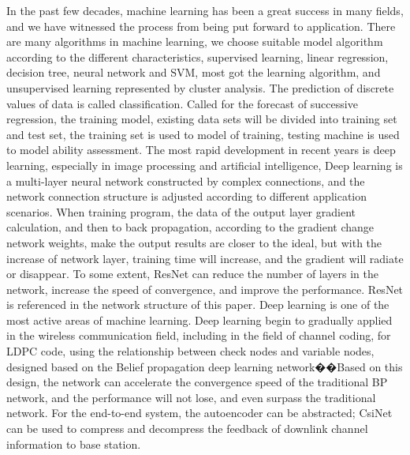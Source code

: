 \documentclass[conference]{IEEEtran}
\begin{document}
In the past few decades, machine learning has been a great success in many fields, and we have witnessed the process from being put forward to application. There are many algorithms in machine learning, we choose suitable model algorithm according to the different characteristics, supervised learning, linear regression, decision tree, neural network and SVM, most got the learning algorithm, and unsupervised learning represented by cluster analysis. The prediction of discrete values of data is called classification. Called for the forecast of successive regression, the training model, existing data sets will be divided into training set and test set, the training set is used to model of training, testing machine is used to model ability assessment.
The most rapid development in recent years is deep learning, especially in image processing and artificial intelligence, Deep learning is a multi-layer neural network constructed by complex connections, and the network connection structure is adjusted according to different application scenarios. When training program, the data of the output layer gradient calculation, and then to back propagation, according to the gradient change network weights, make the output results are closer to the ideal, but with the increase of network layer, training time will increase, and the gradient will radiate or disappear. To some extent, ResNet\cite{ResNet} can reduce the number of layers in the network, increase the speed of convergence, and improve the performance. ResNet is referenced in the network structure of this paper.
Deep learning is one of the most active areas of machine learning. Deep learning begin to gradually applied in the wireless communication field, including in the field of channel coding, for LDPC code, using the relationship between check nodes and variable nodes, designed based on the Belief propagation deep learning network\cite{BCH}��Based on this design, the network can accelerate the convergence speed of the traditional BP network, and the performance will not lose, and even surpass the traditional network. For the end-to-end system, the autoencoder can be abstracted; CsiNet\cite{feedback} can be used to compress and decompress the feedback of downlink channel information to base station.
\end{document}
